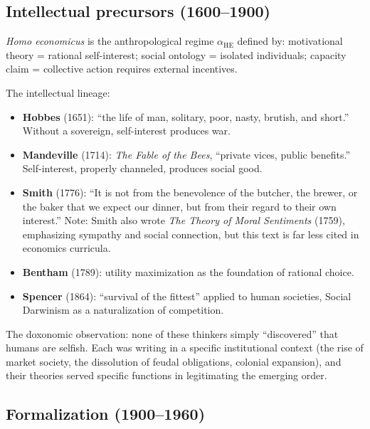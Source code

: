 \subsection{Intellectual precursors (1600--1900)}

\begin{definition}
\label{def:homo-economicus}
\emph{Homo economicus} is the anthropological regime $\alpha_{\text{HE}}$ defined by:
motivational theory = rational self-interest;
social ontology = isolated individuals;
capacity claim = collective action requires external incentives.
\end{definition}

The intellectual lineage:
\begin{itemize}[nosep]
  \item \textbf{Hobbes} (1651): ``the life of man, solitary, poor, nasty, brutish, and short.'' Without a sovereign, self-interest produces war.
  \item \textbf{Mandeville} (1714): \emph{The Fable of the Bees}, ``private vices, public benefits.'' Self-interest, properly channeled, produces social good.
  \item \textbf{Smith} (1776): ``It is not from the benevolence of the butcher, the brewer, or the baker that we expect our dinner, but from their regard to their own interest.'' Note: Smith also wrote \emph{The Theory of Moral Sentiments} (1759), emphasizing sympathy and social connection, but this text is far less cited in economics curricula.
  \item \textbf{Bentham} (1789): utility maximization as the foundation of rational choice.
  \item \textbf{Spencer} (1864): ``survival of the fittest'' applied to human societies, Social Darwinism as a naturalization of competition.
\end{itemize}

The doxonomic observation: none of these thinkers simply ``discovered'' that humans are selfish.
Each was writing in a specific institutional context (the rise of market society, the dissolution of feudal obligations, colonial expansion), and their theories served specific functions in legitimating the emerging order.

\subsection{Formalization (1900--1960)}

